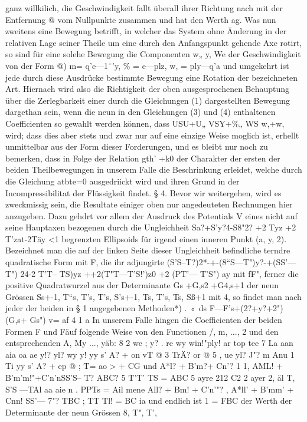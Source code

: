 \documentclass[11pt]{article}
\begin{document}
ganz willkilich, die Geschwindigkeit fallt überall ihrer Richtung nach mit der Entfernung
@ vom Nullpunkte zusammen und hat den Werth ag.
Was nun zweitens eine Bewegung betrifft, in welcher das System ohne Änderung in
der relativen Lage seiner Theile um eine durch den Anfangspunkt gehende Axe rotirt, so
sind für eine solehe Bewegung die Componenten w„ y, We der Geschwindigkeit von der
Form @) m= q’e—1¨’y, \% = e—plz, w, = ply—q’a und umgekehrt ist jede durch diese
Ausdrücke bestimmte Bewegung eine Rotation der bezeichneten Art. Hiernach wird also
die Richtigkeit der oben ausgesprochenen Behauptung über die Zerlegbarkeit einer durch
die Gleichungen (1) dargestellten Bewegung dargethan sein, wenn die neun in den Gleichungen (3) und (4) enthaltenen Coeﬃcienten so gewahlt werden können, dass USU+U„
VSY+\%„ WS w,+w, wird; dass dies aber stets und zwar nur auf eine einzige Weise moglich ist, erhellt unmittelbar aus der Form dieser Forderungen, und es bleibt nur noch
zu bemerken, dass in Folge der Relation gth’ +k0 der Charakter der ersten der beiden
Theilbewegungen in unserem Falle die Beschrinkung erleidet, welche durch die Gleichung
atbte=0 ausgedriickt wird und ihren Grund in der Incompressibilitat der Flüssigkeit findet.
§ 4. Bevor wir weitergehen, wird es zweckmissig sein, die Resultate einiger oben nur angedeuteten Rechnungen hier anzugeben. Dazu gehdrt vor allem der Ausdruck des Potentials
V eines nicht auf seine Hauptaxen bezogenen durch die Ungleichheit Sa?+S’y?4-S8"2? +2
Tyz +2 T’zat-2Täy <1 begrenzten Ellipsoids für irgend einen inneren Punkt (a, y, 2). Bezeichnet man die auf der linken Seite dieser Ungleichheit befindliche terndre quadratische
Form mit F, die ihr adjungirte (S’S–T?)2*-+-(8“S—T")y?-+(SS’— T") 24-2 T’T– TS)yz
++2(T"T—T’S!’)z0 +2 (PT’— T’S") ay mit fF", ferner die positive Quadratwurzel aus
der Determinante Gs +G,s2 +G4,s+1
der neun Grössen Ss+-1, T“s, T’s, T’s, S’s+-1, Ts, T’s, Ts, Sß+1 mit 4, so findet man
nach jeder der beiden in § 1 angegebenen Methoden*) . ◦ ds F—F’s+(2?+y?+2")(G,s+
Gs") v= af 4 1 a In unserem Falle hingen die Coeﬃcienten der beiden Formen F und Fäuf
folgende Weise von den Functionen /, m, ..., 2 und den entsprechenden A, My ..., yäb: 8
2 we ; y? . re wy win!"ply! ar top tee 7 La aan aia oa ae y!? yl? wy y! yy s’ A? + on vT
@ 3 TrÄ? or
@ 5 , ue yl? J"? m Anu 1 Ti yy s’ A? + ep
@ ; T= ao > + CG und A*l? + B’m?+ Cn’? 1 1, AML! + B’m’m!"+C’n’nSS’S– T?
ABC? 5 T’T’ TS = ABC 5 ayre 212 C2 2 ayer 2, äl T, S’S —TAl aa aie n . PPTs
= Ail mene All? + Bm! + C’n’"? , A*ll’ + B’mm’ + Cnn! SS’— 7"? TBC ; TT Tl! =
BC ia und endlich ist 1 = FBC der Werth der Determinante der neun Grössen 8, T", T’,
\end{document}
